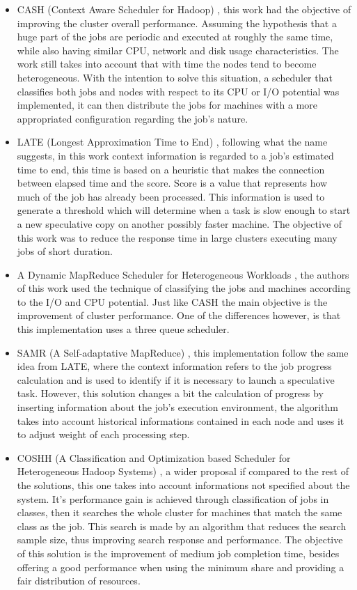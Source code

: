 \begin{itemize}
	\item CASH (Context Aware Scheduler for Hadoop) \cite{CASH}, this work had the objective of improving the cluster overall performance. Assuming the hypothesis that a huge part of the jobs are periodic and executed at roughly the same time, while also having similar CPU, network and disk usage characteristics. The work still takes into account that with time the nodes tend to become heterogeneous. With the intention to solve this situation, a scheduler that classifies both jobs and nodes with respect to its CPU or I/O potential was implemented, it can then distribute the jobs for machines with a more appropriated configuration regarding the job's nature.

	\item LATE (Longest Approximation Time to End) \cite{LATE}, following what the name suggests, in this work context information is regarded to a job's estimated time to end, this time is based on a heuristic that makes the connection between elapsed time and the score. Score is a value that represents how much of the job has already been processed. This information is used to generate a threshold which will determine when a task is slow enough to start a new speculative copy on another possibly faster machine. The objective of this work was to reduce the response time in large clusters executing many jobs of short duration.

	\item A Dynamic MapReduce Scheduler for Heterogeneous Workloads \cite{DMRSHW}, the authors of this work used the technique of classifying the jobs and machines according to the I/O and CPU potential. Just like CASH the main objective is the improvement of cluster performance. One of the differences however, is that this implementation uses a three queue scheduler.

	\item SAMR (A Self-adaptative MapReduce) \cite{SAMR}, this implementation follow the same idea from LATE, where the context information refers to the job progress calculation and is used to identify if it is necessary to launch a speculative task. However, this solution changes a bit the calculation of progress by inserting information about the job's execution environment, the algorithm takes into account historical informations contained in each node and uses it to adjust weight of each processing step.

	\item COSHH (A Classification and Optimization based Scheduler for Heterogeneous Hadoop Systems) \cite{COSHH}, a wider proposal if compared to the rest of the solutions, this one takes into account informations not specified about the system. It's performance gain is achieved through classification of jobs in classes, then it searches the whole cluster for machines that match the same class as the job. This search is made by an algorithm that reduces the search sample size, thus improving search response and performance. The objective of this solution is the improvement of medium job completion time, besides offering a good performance when using the minimum share and providing a fair distribution of resources.


\end{itemize}
